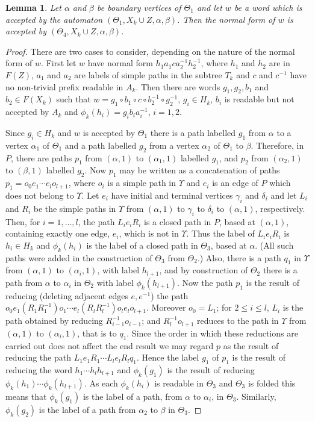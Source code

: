 \documentclass[a4paper,12pt]{article}
\renewcommand{\a}{\alpha }
\renewcommand{\b}{\beta }
\newcommand{\g}{\gamma }
\renewcommand{\d}{\delta }
\newcommand{\T}{\Theta }
\newcommand{\U}{\Upsilon }
\newtheorem{lemma}[theorem]{Lemma}
\numberwithin{equation}{section}
\numberwithin{figure}{section}
\begin{document}
\begin{lemma}
Let $\a$ and $\b$ be boundary vertices of $\T_1$ and let $w$ be a word
 which is accepted by the automaton $(\T_1, X_k\cup Z, \a, \b)$. Then the
normal form of $w$ is accepted by $(\T_4, X_k\cup Z, \a, \b)$. 
\end{lemma}
\begin{proof}
There are two cases to consider, depending on the nature of the 
normal form of $w$. First 
let $w$ have normal form $h_1 a_1 c a_2^{-1} h_2^{-1} $, where 
$h_1$ and $h_2$ are in $F(Z)$,  $a_1$ and $a_2$ are labels 
of simple paths in the subtree $T_k$ and $c$ and $c^{-1}$ have
no non-trivial prefix readable in $A_k$. Then there are words
$g_1, g_2, b_1$ and $b_2\in F(X_k)$ such that 
$w=g_1\circ b_1\circ c \circ b_2^{-1}\circ g_2^{-1}$, 
$g_i\in H_k$, $b_i$ is readable but not accepted by  $A_k$ and  
$\phi_k(h_i)=g_ib_ia_i^{-1}$, $i=1,2$. 

Since $g_i\in H_k$ and $w$ is accepted by $\T_1$ there is a path
labelled $g_1$ from $\a$ to a vertex $\a_1$ of $\T_1$ and a path
labelled $g_2$ from a vertex $\a_2$ of $\T_1$ to $\b$. Therefore, in $P$,
there are paths $p_1$ from $(\a,1)$ to $(\a_1,1)$ labelled $g_1$, and 
$p_2$  
from $(\a_2,1)$ to $(\b,1)$ labelled $g_2$. 
Now $p_1$ may 
be written as a concatenation of paths $p_1=o_0e_1\cdots e_l o_{l+1}$,
where $o_i$ is a simple path in $\U$ and $e_i$ is an edge of $P$ which does
not belong to $\U$.  Let $e_i$ have initial and terminal vertices 
$\g_i$ and $\d_i$ and let $L_i$ and $R_i$ be the simple paths in $\U$ from
$(\a,1)$ to $\g_i$ to $\d_i$ to $(\a,1)$, respectively. 
Then, for $i=1,\ldots ,l$, the path $L_i e_i R_i$ is a closed path in $P$, based
at $(\a,1)$, containing exactly one edge, $e_i$, which is not in $\U$. 
Thus the label of  $L_i e_i R_i$ is $h_i\in H_k$ and $\phi_k(h_i)$ is the
label of a closed path in $\T_3$, based at  $\a$. (All such paths
were added in the construction of $\T_3$ from $\T_2$.)   
Also, there is a path $q_1$ in $\U$ from $(\a,1)$ to $(\a_i,1)$, with 
label $h_{l+1}$, and by construction of $\T_2$ there is a path from $\a$ to
$\a_i$ in $\T_2$ with label $\phi_k(h_{l+1})$. 
Now the path
$p_1$ is the result of reducing (deleting adjacent edges $e,e^{-1}$) the path 
$o_0 e_1 (R_1 R_1^{-1}) o_1 \cdots e_{l}(R_l R_l^{-1}) o_{l}  e_l o_{l+1}$.
Moreover $o_0=L_1$; for $2\le i\le l$, 
$L_i$ is the path obtained by reducing $R_{i-1}^{-1}o_{i-1}$; and 
$R_{l}^{-1}o_{l+1}$ reduces to the path in $\U$ from 
$(\a,1)$ to $(\a_i,1)$, that is to $q_1$. 
Since the
order in which these reductions are carried out does not affect the end
result we may regard $p$ as the result of reducing the path
$L_1 e_1 R_1 \cdots L_l e_l R_l q_1$. Hence the label $g_1$ 
of $p_1$ is the result of 
reducing the word $h_1\cdots h_l h_{l+1}$ and $\phi_k(g_1)$ is the result of
reducing $\phi_k(h_1) \cdots \phi_k(h_{l+1})$. As each $\phi_k(h_i)$ is readable 
in $\T_3$ and $\T_3$ is folded this means  that $\phi_k(g_1)$ is the
label of a path, from $\a$ to   $\a_i$, in $\T_3$. Similarly, $\phi_k(g_2)$
is the label of a path from $\a_2$ to $\b$ in $\T_3$. 
 

\end{proof}



\end{document}
